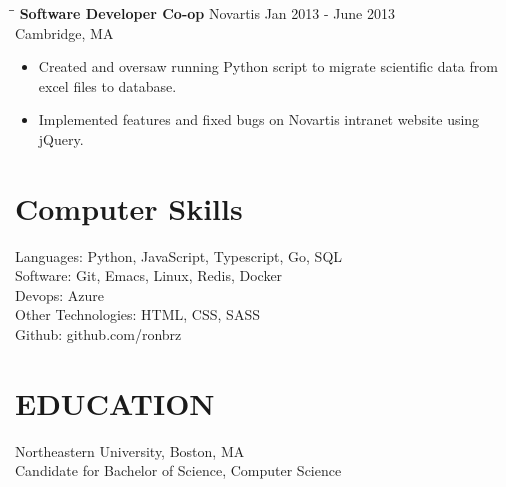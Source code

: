 \documentclass{res}
\begin{document}
\begin{resume}
\begin{tabbing}
   \hspace{2.3in}\= \hspace{2.6in}\= \kill %
    {\bf Software Developer Co-op} \>Novartis \> Jan 2013 - June 2013\\
    \>Cambridge, MA
   \end{tabbing}%
   \begin{itemize}[leftmargin= .1in] \itemsep -2pt
   \item Created and oversaw running Python script to migrate scientific data from excel files
     to database.
   \item Implemented features and fixed bugs on Novartis intranet website using jQuery.
   \end{itemize}
\vspace{-.2in}
\section{Computer Skills}
Languages:  Python, JavaScript, Typescript, Go, SQL \\
Software: Git, Emacs, Linux, Redis, Docker \\
Devops: Azure \\
Other Technologies:  HTML, CSS, SASS \\
Github: github.com/ronbrz
\section{EDUCATION}
Northeastern University, Boston, MA \\
Candidate for Bachelor of Science, Computer Science   \\

\end{resume}
\end{document}
